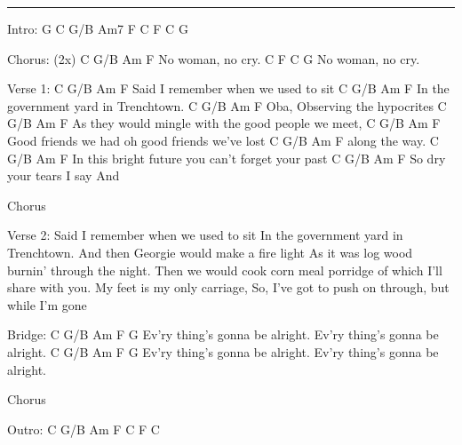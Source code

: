 \noindent\rule{\columnwidth}{1pt}

\begin{lstsong}
Intro:
G  C  G/B  Am7  F  C  F  C  G

Chorus: (2x)
C    G/B           Am  F
  No woman, no cry.
C    F         C      G
  No woman, no cry.

Verse 1:
C        G/B      Am                  F
  Said I remember when we used to sit
C              G/B           Am          F
  In the government yard in Trenchtown.
C                  G/B          Am        F
            Oba, Observing the hypocrites
             C         G/B                     Am      F
As they would mingle   with the good people we meet,
C            G/B              Am                     F
  Good friends we had oh      good friends we've lost
C               G/B          Am         F
               along the way.
C               G/B        Am               F
  In this bright future you can't forget your past
C              G/B      Am                   F
  So dry your  tears I     say                            And

Chorus

Verse 2:
Said I remember when we used to sit
In the government yard in Trenchtown.
And then Georgie would make a fire light
As it was log wood burnin' through the night.
Then we  would cook corn meal porridge
of which I'll share with you.
My feet is my only carriage,
So, I've got to push on through, but while I'm gone

Bridge:
C                     G/B          Am                  F    G
  Ev'ry thing's gonna be alright.  Ev'ry thing's gonna be alright.
C                     G/B          Am                  F    G
  Ev'ry thing's gonna be alright.  Ev'ry thing's gonna be alright.

Chorus

Outro:
C   G/B   Am   F   C   F   C
\end{lstsong}
\newpage

